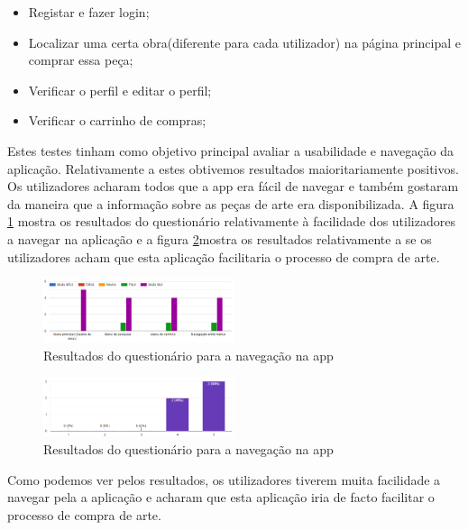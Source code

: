 \documentclass[conference]{IEEEtran}
\begin{document}
\begin{itemize}
    \item Registar e fazer login;
    \item Localizar uma certa obra(diferente para cada utilizador) na página principal e comprar essa peça;
    \item Verificar o perfil e editar o perfil;
    \item Verificar o carrinho de compras;
\end{itemize}

Estes testes tinham como objetivo principal avaliar a usabilidade e navegação da aplicação. 
Relativamente a estes obtivemos resultados maioritariamente positivos. 
Os utilizadores acharam todos que a app era fácil de navegar e também gostaram da maneira 
que a informação sobre as peças de arte era disponibilizada. A figura
\ref{fig:navegacaoTest} mostra os resultados do questionário relativamente 
à facilidade dos utilizadores a navegar na aplicação e a figura
\ref{fig:facilitaTest}mostra os resultados relativamente a se os utilizadores 
acham que esta aplicação facilitaria o processo de compra de arte.

\begin{figure}[ht]
    \centering
    \includegraphics[width=0.5\textwidth]{questionarioNavegacao.png}
    \caption{Resultados do questionário para a navegação na app}
    \label{fig:navegacaoTest}
\end{figure}

\begin{figure}[ht]
    \centering
    \includegraphics[width=0.5\textwidth]{questionarioFacilitar.png}
    \caption{Resultados do questionário para a navegação na app}
    \label{fig:facilitaTest}
\end{figure}

Como podemos ver pelos resultados, os utilizadores tiverem muita facilidade a navegar 
pela a aplicação e acharam que esta aplicação iria de facto facilitar o processo de compra de arte.
\end{document}
